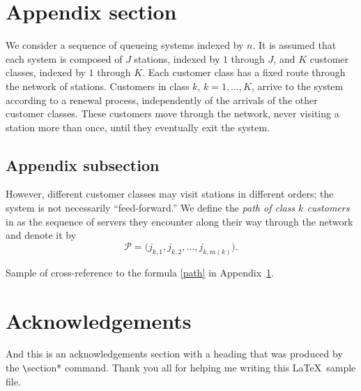 \documentclass[amsa]{ipart}
\begin{document}
\appendix

\section{Appendix section}\label{app}

We consider a sequence of queueing systems
indexed by $n$.  It is assumed that each system
is composed of $J$ stations, indexed by $1$
through $J$, and $K$ customer classes, indexed
by $1$ through $K$.  Each customer class
has a fixed route through the network of
stations.  Customers in class
$k$, $k=1,\ldots,K$, arrive to the
system according to a
renewal process, independently of the arrivals
of the other customer classes.  These customers
move through the network, never visiting a station
more than once, until they eventually exit
the system.

\subsection{Appendix subsection}

However, different customer classes may visit
stations in different orders; the system
is not necessarily ``feed-forward.''
We define the {\em path of class $k$ customers} in
as the sequence of servers
they encounter along their way through the network
and denote it by
\begin{equation}
\mathcal{P}=\bigl(j_{k,1},j_{k,2},\dots,j_{k,m(k)}\bigr). \label{path}
\end{equation}

Sample of cross-reference to the formula \ref{path} in Appendix~\ref{app}.

\section*{Acknowledgements}
And this is an acknowledgements section with a heading that was produced by the
\verb|\|section* command. Thank you all for helping me writing this
\LaTeX\ sample file.
\end{document}
